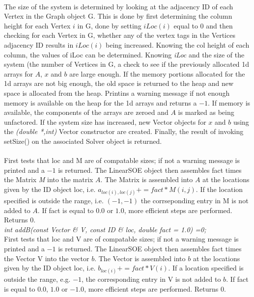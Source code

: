  \\ 
The size of the system is determined by looking at the adjacency ID of
each Vertex in the Graph object \p G. This is done by first
determining the column height for each Vertex $i$ in \p G, done by
setting $iLoc(i)$ equal to $0$ and then checking for each Vertex
in \p G, whether any of the vertex tags in the Vertices adjacency
ID results in $iLoc(i)$ being increased. Knowing the col height of
each column, the values of \p iLoc can be determined. Knowing {\em
iLoc} and the size of the system (the number of Vertices in \p G, 
a check to see if the previously allocated 1d arrays for $A$, $x$ and
$b$ are large enough. If the memory portions allocated for the 1d
arrays are not big enough, the old space is returned to the heap and
new space is allocated from the heap. Printins a warning message if
not enough memory is available on the heap for the 1d arrays and
returns a $-1$. If memory is available, the components of the arrays
are zeroed and $A$ is marked as being unfactored. If the system size
has increased, new Vector objects for $x$ and $b$ using the {\em
(double *,int)} Vector constructor are created. Finally, the result of 
invoking setSize() on the associated Solver object is
returned. \\ 


 \\
First tests that \p loc and \p M are of compatable sizes; if not
a warning message is printed and a $-1$ is returned. The LinearSOE
object then assembles \p fact times the Matrix {\em 
M} into the matrix $A$. The Matrix is assembled into $A$ at the
locations given by the ID object \p loc, i.e. $a_{loc(i),loc(j)} +=
fact * M(i,j)$. If the location specified is outside the range,
i.e. $(-1,-1)$ the corrseponding entry in \p M is not added to
$A$. If \p fact is equal to $0.0$ or $1.0$, more efficient steps
are performed. Returns $0$.  \\


{\em int addB(const Vector \& V, const ID \& loc,
double fact = 1.0) =0;} \\
First tests that \p loc and \p V are of compatable sizes; if not
a warning message is printed and a $-1$ is returned. The LinearSOE
object then assembles \p fact times the Vector \p V into
the vector $b$. The Vector is assembled into $b$ at the locations
given by the ID object \p loc, i.e. $b_{loc(i)} += fact * V(i)$. If a
location specified is outside the range, e.g. $-1$, the corresponding
entry in \p V is not added to $b$. If \p fact is equal to $0.0$,
$1.0$ or $-1.0$, more efficient steps are performed. Returns $0$. \\


